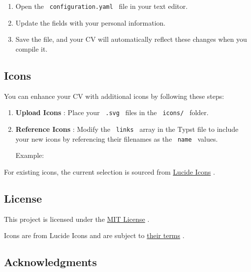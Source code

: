 \begin{enumerate}
\tightlist
\item
  Open the \texttt{\ configuration.yaml\ } file in your text editor.
\item
  Update the fields with your personal information.
\item
  Save the file, and your CV will automatically reflect these changes
  when you compile it.
\end{enumerate}

\subsection{Icons}\label{icons}

You can enhance your CV with additional icons by following these steps:

\begin{enumerate}
\item
  \textbf{Upload Icons} : Place your \texttt{\ .svg\ } files in the
  \texttt{\ icons/\ } folder.
\item
  \textbf{Reference Icons} : Modify the \texttt{\ links\ } array in the
  Typst file to include your new icons by referencing their filenames as
  the \texttt{\ name\ } values.

  Example:

\begin{Shaded}
\begin{Highlighting}[]
\NormalTok{links: [}
\NormalTok{]}
\end{Highlighting}
\end{Shaded}
\end{enumerate}

For existing icons, the current selection is sourced from
\href{https://lucide.dev/icons/}{Lucide Icons} .

\subsection{License}\label{license}

This project is licensed under the
\href{https://github.com/typst/packages/raw/main/packages/preview/vantage-cv/1.0.0/LICENSE}{MIT
License} .

Icons are from Lucide Icons and are subject to
\href{https://lucide.dev/license}{their terms} .

\subsection{Acknowledgments}\label{acknowledgments}

